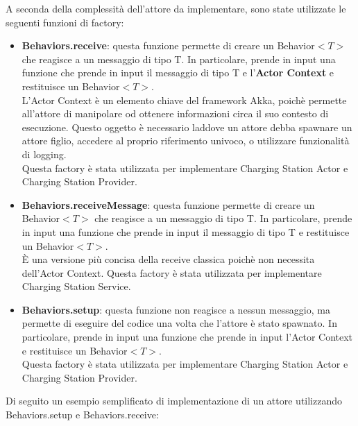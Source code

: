 A seconda della complessità dell'attore da implementare, sono state utilizzate le seguenti
funzioni di factory:
\begin{itemize}
      \item \textbf{Behaviors.receive}: questa funzione permette di creare un Behavior$<T>$
            che reagisce a un messaggio di tipo T. In particolare, prende in input una funzione
            che prende in input il messaggio di tipo T e l'\textbf{Actor Context} e restituisce
            un Behavior$<T>$.\\

            L'Actor Context è un elemento chiave del framework Akka, poichè permette all'attore
            di manipolare od ottenere informazioni circa il suo contesto di esecuzione.
            Questo oggetto è necessario laddove un attore debba spawnare un attore figlio,
            accedere al proprio riferimento univoco, o utilizzare funzionalità di logging.\\

            Questa factory è stata utilizzata per implementare Charging Station Actor e Charging
            Station Provider.
      \item \textbf{Behaviors.receiveMessage}: questa funzione permette di creare un Behavior$<T>$
            che reagisce a un messaggio di tipo T. In particolare, prende in input una funzione che
            prende in input il messaggio di tipo T e restituisce un Behavior$<T>$.\\

            È una versione più concisa della receive classica poichè non necessita dell'Actor
            Context. Questa factory è stata utilizzata per implementare Charging Station Service.
      \item \textbf{Behaviors.setup}: questa funzione non reagisce a nessun messaggio, ma permette
            di eseguire del codice una volta che l'attore è stato spawnato. In particolare, prende in
            input una funzione che prende in input l'Actor Context e restituisce un Behavior$<T>$.\\

            Questa factory è stata utilizzata per implementare Charging Station Actor e Charging
            Station Provider.
\end{itemize}

Di seguito un esempio semplificato di implementazione di un attore utilizzando Behaviors.setup e
Behaviors.receive:\\

